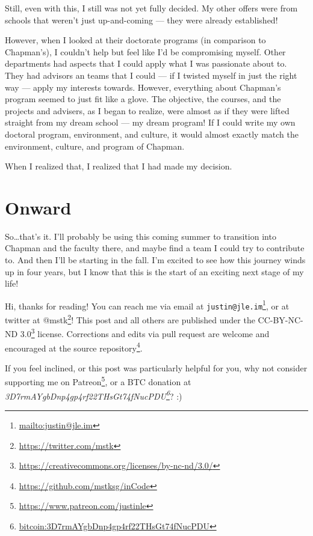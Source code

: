 \documentclass[]{article}
\renewcommand{\href}[2]{#2\footnote{\url{#1}}}
\begin{document}
Still, even with this, I still was not yet fully decided. My other offers were
from schools that weren't just up-and-coming --- they were already established!

However, when I looked at their doctorate programs (in comparison to Chapman's),
I couldn't help but feel like I'd be compromising myself. Other departments had
aspects that I could apply what I was passionate about to. They had advisors an
teams that I could --- if I twisted myself in just the right way --- apply my
interests towards. However, everything about Chapman's program seemed to just
fit like a glove. The objective, the courses, and the projects and advisers, as
I began to realize, were almost as if they were lifted straight from my dream
school --- my dream program! If I could write my own doctoral program,
environment, and culture, it would almost exactly match the environment,
culture, and program of Chapman.

When I realized that, I realized that I had made my decision.

\hypertarget{onward}{%
\section{Onward}\label{onward}}

So\ldots{}that's it. I'll probably be using this coming summer to transition
into Chapman and the faculty there, and maybe find a team I could try to
contribute to. And then I'll be starting in the fall. I'm excited to see how
this journey winds up in four years, but I know that this is the start of an
exciting next stage of my life!

Hi, thanks for reading! You can reach me via email at
\href{mailto:justin@jle.im}{\nolinkurl{justin@jle.im}}, or at twitter at
\href{https://twitter.com/mstk}{@mstk}! This post and all others are published
under the \href{https://creativecommons.org/licenses/by-nc-nd/3.0/}{CC-BY-NC-ND
3.0} license. Corrections and edits via pull request are welcome and encouraged
at \href{https://github.com/mstksg/inCode}{the source repository}.

If you feel inclined, or this post was particularly helpful for you, why not
consider \href{https://www.patreon.com/justinle}{supporting me on Patreon}, or a
BTC donation at
\emph{\href{bitcoin:3D7rmAYgbDnp4gp4rf22THsGt74fNucPDU}{3D7rmAYgbDnp4gp4rf22THsGt74fNucPDU}}?
:)
\end{document}
